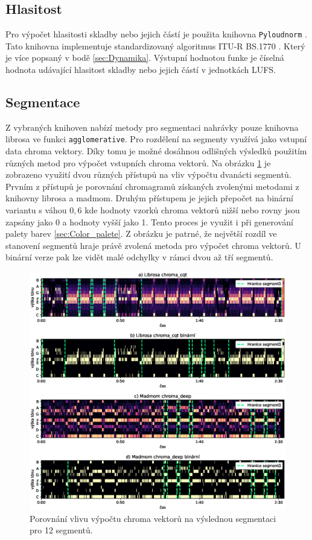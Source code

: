 \subsection{Hlasitost} \label{sec:Pyloudnorm}
Pro výpočet hlasitosti skladby nebo jejich částí je použita knihovna \texttt{Pyloudnorm} \cite{Pyloudnorm}. Tato knihovna implementuje standardizovaný algoritmus ITU-R BS.1770 \cite{BS.1770}. Který je více popsaný v bodě \ref{sec:Dynamika}. Výstupní hodnotou funke je číselná hodnota udávající hlasitost skladby nebo jejich částí v jednotkách LUFS. 

\subsection{Segmentace} \label{sec:Segmentace}
Z vybraných knihoven nabízí metody pro segmentaci nahrávky pouze knihovna librosa ve funkci \texttt{agglomerative}. Pro rozdělení na segmenty využívá jako vstupní data chroma vektory. Díky tomu je možné dosáhnou odlišných výsledků použitím různých metod pro výpočet vstupních chroma vektorů. Na obrázku \ref{fig:Segmentation_chroma_comparison} je zobrazeno využití dvou různých přístupů na vliv výpočtu dvanácti segmentů. Prvním z přístupů je porovnání chromagramů získaných zvolenými metodami z knihovny librosa a madmom. Druhým přístupem je jejich přepočet na binární variantu s váhou  $0,6$ kde hodnoty vzorků chroma vektorů nižší nebo rovny jsou zapsány jako 0 a hodnoty vyšší jako 1. Tento proces je využit i při generování palety barev \ref{sec:Color_palete}. Z obrázku je patrné, že největší rozdíl ve stanovení segmentů hraje právě zvolená metoda pro výpočet chroma vektorů. U binární verze pak lze vidět malé odchylky v rámci dvou až tří segmentů. 

\begin{figure}[H]
    \centering
    \includegraphics[width = 1\linewidth]{obrazky/Segmentation_chroma_comparisons.eps}
    \caption{Porovnání vlivu výpočtu chroma vektorů na výslednou segmentaci pro 12 segmentů.}
    \label{fig:Segmentation_chroma_comparison}
\end{figure}

